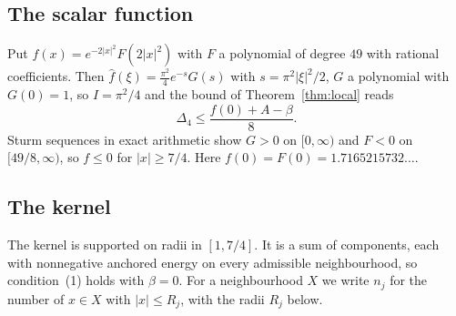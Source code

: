 \documentclass[11pt]{amsart}
\numberwithin{equation}{section}
\theoremstyle{remark}
\begin{document}
\subsection*{The scalar function}
Put $f(x)=e^{-2|x|^2}F(2|x|^2)$ with $F$ a polynomial of degree $49$ with rational coefficients. Then $\hat f(\xi)=\frac{\pi^2}{4}e^{-s}G(s)$ with $s=\pi^2|\xi|^2/2$, $G$ a polynomial with $G(0)=1$, so $I=\pi^2/4$ and the bound of Theorem~\ref{thm:local} reads
\begin{equation}\label{eq:normal}
\Delta_4\le\frac{f(0)+A-\beta}{8}.
\end{equation}
Sturm sequences in exact arithmetic show $G>0$ on $[0,\infty)$ and $F<0$ on $[49/8,\infty)$, so $f\le0$ for $|x|\ge7/4$. Here $f(0)=F(0)=1.7165215732\ldots$.

\subsection*{The kernel}
The kernel is supported on radii in $[1,7/4]$. It is a sum of components, each with nonnegative anchored energy on every admissible neighbourhood, so condition~(1) holds with $\beta=0$. For a neighbourhood $X$ we write $n_j$ for the number of $x\in X$ with $|x|\le R_j$, with the radii $R_j$ below.
\end{document}
